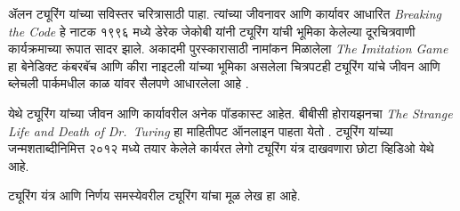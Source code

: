 \documentclass[../../../include/open-logic-section]{subfiles}
\begin{document}
\begin{reading}
ॲलन ट्यूरिंग यांच्या सविस्तर चरित्रासाठी \citet{Hodges2014} पाहा. त्यांच्या जीवनावर आणि कार्यावर आधारित \emph{Breaking the Code} हे नाटक १९९६ मध्ये डेरेक जेकोबी यांनी ट्यूरिंग यांची भूमिका केलेल्या दूरचित्रवाणी कार्यक्रमाच्या रूपात सादर झाले. अकादमी पुरस्कारासाठी नामांकन मिळालेला \emph{The Imitation Game} हा बेनेडिक्ट कंबरबॅच आणि कीरा नाइटली यांच्या भूमिका असलेला चित्रपटही ट्यूरिंग यांचे जीवन आणि ब्लेचली पार्कमधील काळ यांवर सैलपणे आधारलेला आहे \citep{Imitation2014}.

\citet{Radiolab2012} येथे ट्यूरिंग यांच्या जीवन आणि कार्यावरील अनेक पॉडकास्ट आहेत. बीबीसी होरायझनचा \emph{The Strange Life and Death of
  Dr.~Turing} हा माहितीपट ऑनलाइन पाहता येतो \citep{Sykes1992}. ट्यूरिंग यांच्या जन्मशताब्दीनिमित्त २०१२ मध्ये तयार केलेले कार्यरत लेगो ट्यूरिंग यंत्र दाखवणारा छोटा व्हिडिओ \citep{Theelen2012} येथे आहे.

ट्यूरिंग यंत्र आणि निर्णय समस्येवरील ट्यूरिंग यांचा मूळ लेख \citet{Turing1937} हा आहे.
\end{reading}
\end{document}
